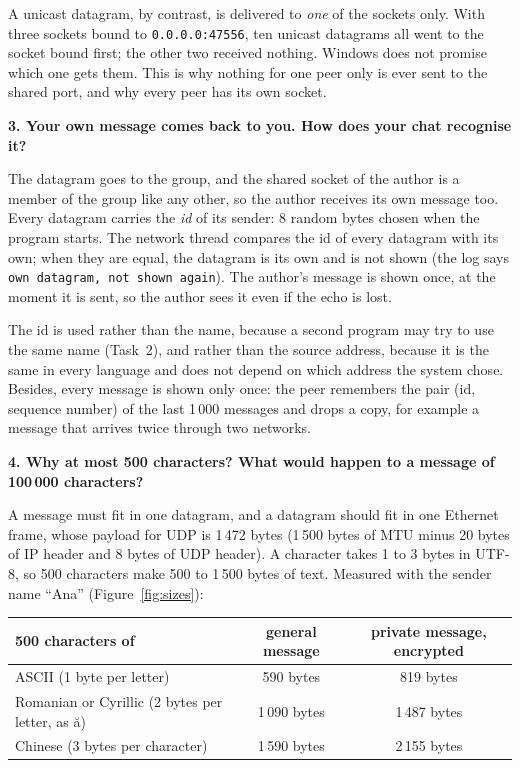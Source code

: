 \documentclass[11pt,a4paper]{article}
\newcommand{\question}[1]{\par\medskip\textbf{#1}\par}
\newcommand{\code}[1]{{\frenchspacing\texttt{#1}}}
\begin{document}
A unicast datagram, by contrast, is delivered to \emph{one} of the sockets only. With three sockets
bound to \code{0.0.0.0:47556}, ten unicast datagrams all went to the socket bound first; the other
two received nothing. Windows does not promise which one gets them. This is why nothing for one
peer only is ever sent to the shared port, and why every peer has its own socket.

\question{3. Your own message comes back to you. How does your chat recognise it?}

The datagram goes to the group, and the shared socket of the author is a member of the group like
any other, so the author receives its own message too. Every datagram carries the \emph{id} of its
sender: 8 random bytes chosen when the program starts. The network thread compares the id of every
datagram with its own; when they are equal, the datagram is its own and is not shown (the log says
\code{own datagram, not shown again}). The author's message is shown once, at the moment it is
sent, so the author sees it even if the echo is lost.

The id is used rather than the name, because a second program may try to use the same name (Task~2),
and rather than the source address, because it is the same in every language and does not depend on
which address the system chose. Besides, every message is shown only once: the peer remembers the
pair (id, sequence number) of the last 1\,000 messages and drops a copy, for example a message that
arrives twice through two networks.

\question{4. Why at most 500 characters? What would happen to a message of 100\,000 characters?}

A message must fit in one datagram, and a datagram should fit in one Ethernet frame, whose payload
for UDP is 1\,472 bytes (1\,500 bytes of MTU minus 20 bytes of IP header and 8 bytes of UDP header).
A character takes 1 to 3 bytes in UTF-8, so 500 characters make 500 to 1\,500 bytes of text.
Measured with the sender name ``Ana'' (Figure~\ref{fig:sizes}):

\begin{center}
\small
\begin{tabular}{lcc}
\toprule
500 characters of & general message & private message, encrypted \\
\midrule
ASCII (1 byte per letter)                       & 590 bytes   & 819 bytes \\
Romanian or Cyrillic (2 bytes per letter, as \u{a}) & 1\,090 bytes & 1\,487 bytes \\
Chinese (3 bytes per character)                 & 1\,590 bytes & 2\,155 bytes \\
\bottomrule
\end{tabular}
\end{center}
\end{document}
